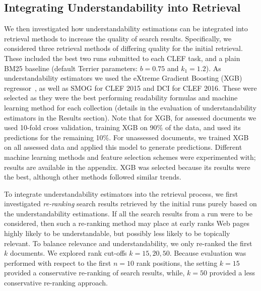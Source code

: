 \subsection{Integrating Understandability into Retrieval}
\label{sec:method_ltr}

We then investigated how understandability estimations can be integrated into retrieval methods to increase the quality of search results. %
Specifically, we considered three retrieval methods of differing quality for the initial retrieval. These included the best two runs submitted to each CLEF task, and a plain BM25 baseline (default Terrier parameters: $b=0.75$ and $k_1=1.2$). As understandability estimators we used the eXtreme Gradient Boosting (XGB) regressor~\cite{chen16}, as well as SMOG for CLEF 2015 and DCI for CLEF 2016. 
These were selected as they were the best performing readability formulas and machine learning method for each collection (details in the evaluation of understandability estimators in the Results section).
Note that for XGB, for assessed documents we used 10-fold cross validation, training XGB on 90\% of the data, and used its predictions for the remaining 10\%. For unassessed documents, we trained XGB on all assessed data and applied this model to generate predictions. Different machine learning methods and feature selection schemes were experimented with; results are available in the appendix. XGB was selected because its results were the best, although other methods followed similar trends.


To integrate understandability estimators into the retrieval process, we first investigated \textit{re-ranking} search results retrieved by the initial runs purely based on the understandability estimations. 
If all the search results from a run were to be considered, then such a re-ranking method may place at early ranks Web pages highly likely to be understandable, but possibly less likely to be topically relevant. To balance relevance and understandability, we only re-ranked the first $k$ documents. We explored rank cut-offs $k = 15, 20, 50$. Because evaluation was performed with respect to the first $n=10$ rank positions, the setting $k=15$ provided a conservative re-ranking of search results, while, $k=50$ provided a less conservative re-ranking approach.

